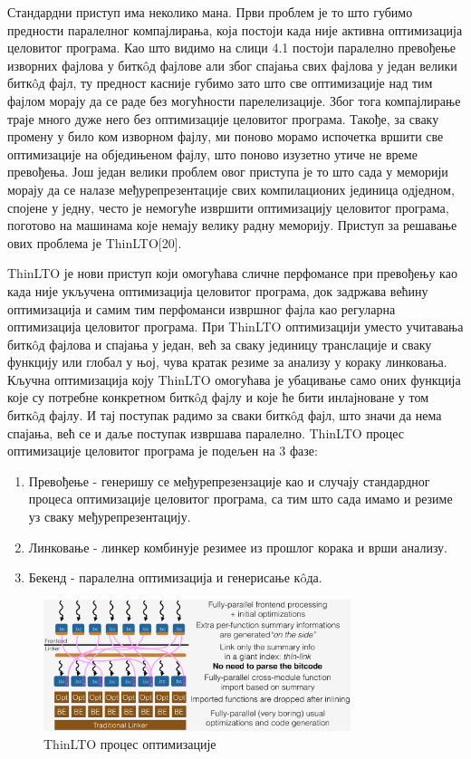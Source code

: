 \documentclass[12pt,oneside]{memoir}
\begin{document}
Стандардни приступ има неколико мана.
Први проблем је то што губимо предности паралелног компајлирања, која постоји 
када није активна оптимизација целовитог програма.
Као што видимо на слици 4.1 постоји паралелно превођење изворних фајлова у 
битк\^{o}д фајлове али због спајања свих фајлова у један велики битк\^{o}д фајл,
ту предност касније губимо зато што све оптимизације над тим фајлом морају 
да се раде без могућности парелелизације.
Због тога компајлирање траје много дуже него без оптимизације целовитог програма.
Такође, за сваку промену у било ком изворном фајлу, ми поново морамо испочетка
вршити све оптимизације на обједињеном фајлу, што поново изузетно утиче не време
превођења.
Још један велики проблем овог приступа је то што сада у меморији морају да се налазе  међурепрезентације свих компилационих јединица одједном, спојене
у једну, често је немогуће извршити оптимизацију целовитог програма, поготово на 
машинама које немају велику радну меморију.
Приступ за решавање ових проблема је  ThinLTO[20].
\par ThinLTO је нови приступ који омогућава сличне перфомансе при превођењу
као када није укључена оптимизација целовитог програма, док задржава већину
оптимизација и самим тим перфоманси извршног фајла као регуларна оптимизација
целовитог програма.
При ThinLTO оптимизацији уместо учитавања битк\^{o}д фајлова и спајања у један,
већ за сваку јединицу транслације и сваку функцију или глобал у њој, чува кратак
резиме за анализу у кораку линковања. 
Кључна оптимизација коју ThinLTO омогућава је убацивање само оних функција које
су потребне конкретном битк\^{o}д фајлу и које ће бити инлајноване у том  битк\^{o}д фајлу.
И тај поступак радимо за сваки  битк\^{o}д фајл, што значи да нема спајања, већ се и
даље поступак  извршава паралелно.
ThinLTO процес оптимизације целовитог програма је подељен на 3 фазе:
\begin{enumerate}
\item Превођење - генеришу се међурепрезензације као и случају стандардног процеса
	оптимизације целовитог програма, са тим што сада имамо и резиме уз сваку
	међурепрезентацију.
\item Линковање - линкер комбинује резимее из прошлог корака и врши анализу.
\item Бекенд - паралелна оптимизација и генерисање к\^{o}да.
\end{enumerate}
 
\begin{figure}[!ht]
  \centering
  \includegraphics[width=0.8\textwidth]{LTO_thin.png}
  \caption{ThinLTO процес оптимизације}
  \label{fig:grafikon}
\end{figure}
\end{document}
